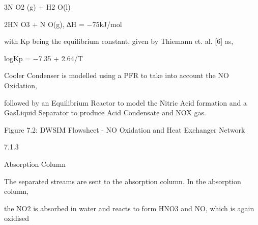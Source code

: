 \documentclass[a4paper,portrait,12pt]{article}
\begin{document}
\begin{flushleft}
3N O2 (g) + H2 O(l)
\end{flushleft}





\begin{flushleft}
2HN O3 + N O(g), ∆H = $-$75kJ/mol
\end{flushleft}





\begin{flushleft}
with Kp being the equilibrium constant, given by Thiemann et. al. [6] as,
\end{flushleft}


\begin{flushleft}
logKp = $-$7.35 + 2.64/T
\end{flushleft}


\begin{flushleft}
Cooler Condenser is modelled using a PFR to take into account the NO Oxidation,
\end{flushleft}


\begin{flushleft}
followed by an Equilibrium Reactor to model the Nitric Acid formation and a GasLiquid Separator to produce Acid Condensate and NOX gas.
\end{flushleft}





\begin{flushleft}
Figure 7.2: DWSIM Flowsheet - NO Oxidation and Heat Exchanger Network
\end{flushleft}





7.1.3





\begin{flushleft}
Absorption Column
\end{flushleft}





\begin{flushleft}
The separated streams are sent to the absorption column. In the absorption column,
\end{flushleft}


\begin{flushleft}
the NO2 is absorbed in water and reacts to form HNO3 and NO, which is again oxidised
\end{flushleft}
\end{document}
